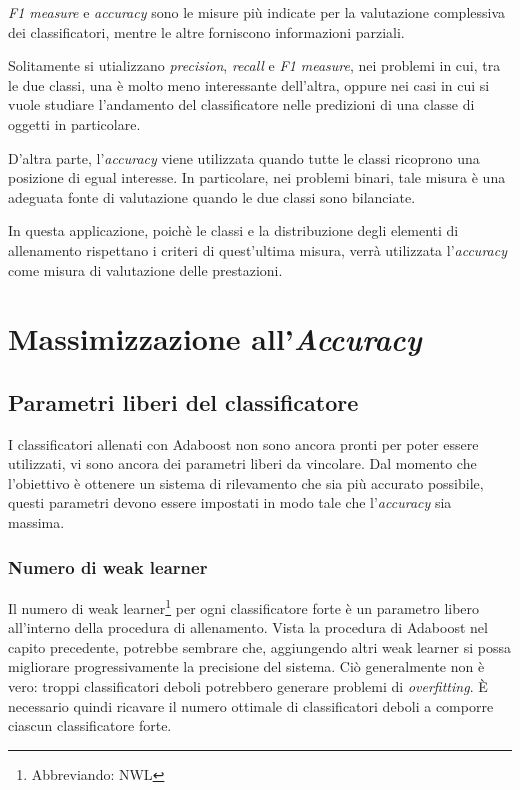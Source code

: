         \emph{F1 measure} e \emph{accuracy} sono le misure più indicate per la valutazione complessiva dei classificatori, mentre le altre forniscono informazioni parziali.

        Solitamente si utializzano \emph{precision}, \emph{recall} e \emph{F1 measure}, nei problemi in cui, tra le due classi, una è molto meno interessante dell'altra, oppure nei casi in cui si vuole studiare l'andamento del classificatore nelle predizioni di una classe di oggetti in particolare.

        D'altra parte, l'\emph{accuracy} viene utilizzata quando tutte le classi ricoprono una posizione di egual interesse. 
        In particolare, nei problemi binari, tale misura è una adeguata fonte di valutazione quando le due classi sono bilanciate.

        In questa applicazione, poichè le classi e la distribuzione degli elementi di allenamento rispettano i criteri di quest'ultima misura, verrà utilizzata l'\emph{accuracy} come misura di valutazione delle prestazioni.
        

    \section{Massimizzazione all'\emph{Accuracy}}
    \label{sec:accuracy_maximization}
        \subsection{Parametri liberi del classificatore}
        I classificatori allenati con Adaboost non sono ancora pronti per poter essere utilizzati, vi sono ancora dei parametri liberi da vincolare.
        Dal momento che l'obiettivo è ottenere un sistema di rilevamento che sia più accurato possibile, questi parametri devono essere impostati in modo tale che l'\emph{accuracy} sia massima.
            \subsubsection{Numero di weak learner}
                Il numero di weak learner\footnote{Abbreviando: NWL} per ogni classificatore forte è un parametro libero all'interno della procedura di allenamento.
                Vista la procedura di Adaboost nel capito precedente, potrebbe sembrare che, aggiungendo altri weak learner si possa migliorare progressivamente la precisione del sistema.
                Ciò generalmente non è vero: troppi classificatori deboli potrebbero generare problemi di \emph{overfitting}.
                È necessario quindi ricavare il numero ottimale di classificatori deboli a comporre ciascun classificatore forte.

